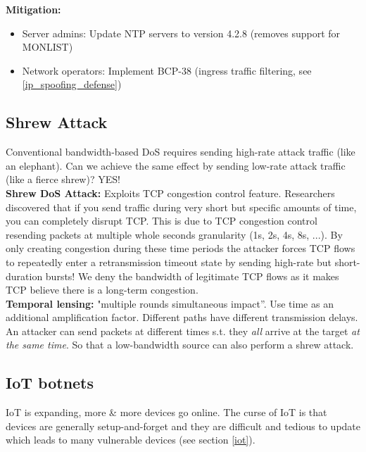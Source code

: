 \documentclass[11pt,oneside,a4paper]{article}
\begin{document}
\textbf{Mitigation:}

\vspace{-\topsep}
\begin{itemize}
	\setlength{\itemsep}{0pt}
	\setlength{\parskip}{0pt}
	\item Server admins: Update NTP servers to version 4.2.8 (removes support for MONLIST)
	\item Network operators: Implement BCP-38 (ingress traffic filtering, see \ref{ip_spoofing_defense})
\end{itemize}
\vspace{-\topsep}

\newpage

\subsection{Shrew Attack}

Conventional bandwidth-based DoS requires sending high-rate attack traffic (like an elephant). Can we achieve the same effect by sending low-rate attack traffic (like a fierce shrew)? YES!\\

\textbf{Shrew DoS Attack:} Exploits TCP congestion control feature. Researchers discovered that if you send traffic during very short but specific amounts of time, you can completely disrupt TCP. This is due to TCP congestion control resending packets at multiple whole seconds granularity (1s, 2s, 4s, 8s, ...). By only creating congestion during these time periods 
the attacker forces TCP flows to repeatedly enter a retransmission timeout state by sending high-rate but short-duration bursts! We deny the bandwidth of legitimate TCP flows as it makes TCP believe there is a long-term congestion.\\

\textbf{Temporal lensing:} "multiple rounds simultaneous impact”. Use time as an additional amplification factor. Different paths have different transmission delays. An attacker can send packets at different times s.t. they \textit{all} arrive at the target \textit{at the same time}. So that a low-bandwidth source can also perform a shrew attack.

\subsection{IoT botnets}

IoT is expanding, more \& more devices go online. The curse of IoT is that devices are generally setup-and-forget and they are difficult and tedious to update which leads to many vulnerable devices (see section \ref{iot}).\\
\end{document}
